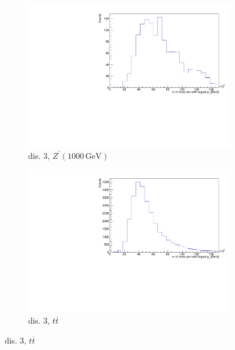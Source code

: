 \begin{figure}[H]
  \begin{subfigure}{0.45\textwidth}%
    \centering%
    \includegraphics[width=\textwidth]{plots/discriminant/zprime1000.el_dis3.pdf}%
    \caption{dis. 3, $Z^\prime(1000 \, \si{\giga\eV})$}%
    \label{fig:5e}%
  \end{subfigure}%
  \hfill
  \begin{subfigure}{0.45\textwidth}%
    \centering%
    \includegraphics[width=\textwidth]{plots/discriminant/ttbar.el_dis3.pdf}%
    \caption{dis. 3, $t \overline{t}$}%
    \label{fig:5f}%
  \end{subfigure}%


\end{figure}
